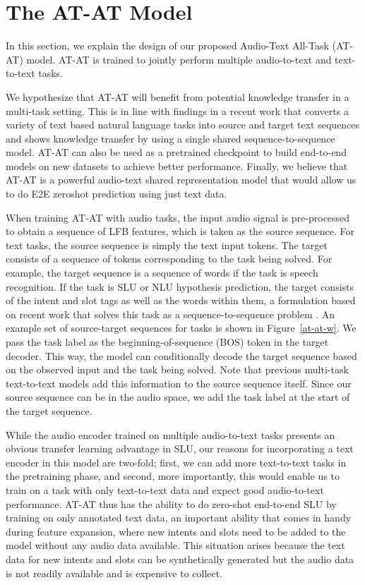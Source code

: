 \documentclass[letterpaper]{article} \usepackage{aaai21}  \usepackage{times}  \usepackage{helvet} \usepackage{courier}  \usepackage[hyphens]{url}  \usepackage{graphicx} \usepackage{booktabs}
\begin{document}
\section{The AT-AT Model}
In this section, we explain the design of our proposed Audio-Text All-Task (AT-AT) model. AT-AT is trained to jointly perform multiple audio-to-text and text-to-text tasks. 

We hypothesize that AT-AT will benefit from potential knowledge transfer in a multi-task setting. This is in line with findings in a recent work \cite{Raffel2019ExploringTL} that converts a variety of text based natural language tasks into source and target text sequences and shows knowledge transfer by using a single shared sequence-to-sequence model. AT-AT can also be used as a pretrained checkpoint to build end-to-end models on new datasets to achieve better performance. Finally, we believe that AT-AT is a powerful audio-text shared representation model that would allow us to do E2E zeroshot prediction using just text data. 


When training AT-AT with audio tasks, the input audio signal is pre-processed to obtain a sequence of LFB features, which is taken as the source sequence. For text tasks, the source sequence is simply the text input tokens. The target consists of a sequence of tokens corresponding to the task being solved. For example, the target sequence is a sequence of words if the task is speech recognition. If the task is SLU or NLU hypothesis prediction, the target consists of the intent and slot tags as well as the words within them, a formulation based on recent work that solves this task as a sequence-to-sequence problem \cite{Rongali_2020}. An example set of source-target sequences for tasks is shown in Figure~\ref{at-at-w}. We pass the task label as the beginning-of-sequence (BOS) token in the target decoder. This way, the model can conditionally decode the target sequence based on the observed input and the task being solved. Note that previous multi-task text-to-text models \cite{Raffel2019ExploringTL} add this information to the source sequence itself. Since our source sequence can be in the audio space, we add the task label at the start of the target sequence. 

While the audio encoder trained on multiple audio-to-text tasks presents an obvious transfer learning advantage in SLU, our reasons for incorporating a text encoder in this model are two-fold; first, we can add more text-to-text tasks in the pretraining phase, and second, more importantly, this would enable us to train on a task with only text-to-text data and expect good audio-to-text performance. AT-AT thus has the ability to do zero-shot end-to-end SLU by training on only annotated text data, an important ability that comes in handy during feature expansion, where new intents and slots need to be added to the model without any audio data available. This situation arises because the text data for new intents and slots can be synthetically generated but the audio data is not readily available and is expensive to collect.
\end{document}
